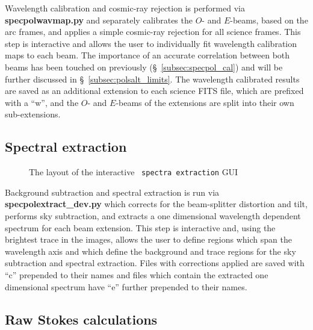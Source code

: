 Wavelength calibration and cosmic-ray rejection is performed via \textbf{specpolwavmap.py} and separately calibrates the $O$- and $E$-beams, based on the arc frames, and applies a simple cosmic-ray rejection for all science frames. This step is interactive and allows the user to individually fit wavelength calibration maps to each beam. The importance of an accurate correlation between both beams has been touched on previously (\S~\ref{subsec:specpol_cal}) and will be further discussed in \S~\ref{subsec:polsalt_limits}. The wavelength calibrated results are saved as an additional extension to each science FITS file, which are prefixed with a ``w'', and the $O$- and $E$-beams of the extensions are split into their own sub-extensions.

\subsection{Spectral extraction}

\begin{figure}[t]
    \centering
    \caption{The layout of the interactive \polsalt\ \texttt{spectra extraction} \gls{GUI}}
    \label{fig:polsalt_gui_spec}
\end{figure}

Background subtraction and spectral extraction is run via \textbf{spec\-pol\-extract\_dev.py} which corrects for the beam-splitter distortion and tilt, performs sky subtraction, and extracts a one dimensional wavelength dependent spectrum for each beam extension. This step is interactive and, using the brightest trace in the images, allows the user to define regions which span the wavelength axis and which define the background and trace regions for the sky subtraction and spectral extraction. Files with corrections applied are saved with ``c'' prepended to their names and files which contain the extracted one dimensional spectrum have ``e'' further prepended to their names.

\subsection{Raw Stokes calculations}

